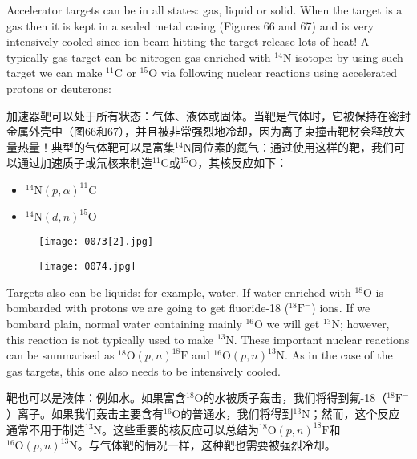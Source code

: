 \documentclass[dvipsnames, svgnames,a4paper,11pt]{article}
\begin{document}
Accelerator targets can be in all states: gas, liquid or solid. When the target is a gas then it is kept in a sealed metal casing (Figures 66 and 67) and is very intensively cooled since ion beam hitting the target release lots of heat! A typically gas target can be nitrogen gas enriched with $^{14}\text{N}$ isotope: by using such target we can make $^{11}\text{C}$ or $^{15}\text{O}$ via following nuclear reactions using accelerated protons or deuterons:

加速器靶可以处于所有状态：气体、液体或固体。当靶是气体时，它被保持在密封金属外壳中（图66和67），并且被非常强烈地冷却，因为离子束撞击靶材会释放大量热量！典型的气体靶可以是富集$^{14}\text{N}$同位素的氮气：通过使用这样的靶，我们可以通过加速质子或氘核来制造$^{11}\text{C}$或$^{15}\text{O}$，其核反应如下：

\begin{itemize}
    \item $^{14}\text{N}(p,\alpha)^{11}\text{C}$
    \item $^{14}\text{N}(d,n)^{15}\text{O}$
\end{itemize}

\begin{figure}[ht]
    \centering
    \texttt{[image: 0073[2].jpg]}
     \label{fig66}
\end{figure}

\begin{figure}[ht]
    \centering
    \texttt{[image: 0074.jpg]}
     \label{fig67}
\end{figure}

Targets also can be liquids: for example, water. If water enriched with $^{18}\text{O}$ is bombarded with protons we are going to get fluoride-18 ($^{18}\text{F}^-$) ions. If we bombard plain, normal water containing mainly $^{16}\text{O}$ we will get $^{13}\text{N}$; however, this reaction is not typically used to make $^{13}\text{N}$. These important nuclear reactions can be summarised as $^{18}\text{O}(p,n)^{18}\text{F}$ and $^{16}\text{O}(p,n)^{13}\text{N}$. As in the case of the gas targets, this one also needs to be intensively cooled.

靶也可以是液体：例如水。如果富含$^{18}\text{O}$的水被质子轰击，我们将得到氟-18（$^{18}\text{F}^-$）离子。如果我们轰击主要含有$^{16}\text{O}$的普通水，我们将得到$^{13}\text{N}$；然而，这个反应通常不用于制造$^{13}\text{N}$。这些重要的核反应可以总结为$^{18}\text{O}(p,n)^{18}\text{F}$和$^{16}\text{O}(p,n)^{13}\text{N}$。与气体靶的情况一样，这种靶也需要被强烈冷却。
\end{document}
